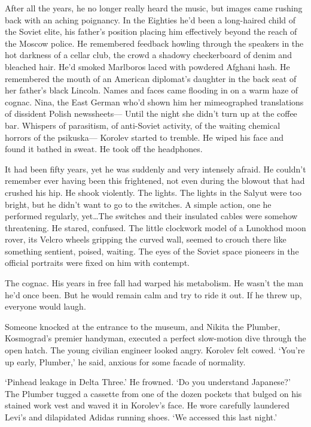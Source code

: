 After all the years, he no longer really heard the music, but images came rushing back with an aching poignancy. In the Eighties he’d been a long-haired child of the Soviet elite, his father’s position placing him effectively beyond the reach of the Moscow police. He remembered feedback howling through the speakers in the hot darkness of a cellar club, the crowd a shadowy checkerboard of denim and bleached hair. He’d smoked Marlboros laced with powdered Afghani hash. He remembered the mouth of an American diplomat’s daughter in the back seat of her father’s black Lincoln. Names and faces came flooding in on a warm haze of cognac. Nina, the East German who’d shown him her mimeographed translations of dissident Polish newssheets— Until the night she didn’t turn up at the coffee bar. Whispers of parasitism, of anti-Soviet activity, of the waiting chemical horrors of the psikuska— Korolev started to tremble. He wiped his face and found it bathed in sweat. He took off the headphones.

It had been fifty years, yet he was suddenly and very intensely afraid. He couldn’t remember ever having been this frightened, not even during the blowout that had crushed his hip. He shook violently. The lights. The lights in the Salyut were too bright, but he didn’t want to go to the switches. A simple action, one he performed regularly, yet…The switches and their insulated cables were somehow threatening. He stared, confused. The little clockwork model of a Lunokhod moon rover, its Velcro wheels gripping the curved wall, seemed to crouch there like something sentient, poised, waiting. The eyes of the Soviet space pioneers in the official portraits were fixed on him with contempt.

The cognac. His years in free fall had warped his metabolism. He wasn’t the man he’d once been. But he would remain calm and try to ride it out. If he threw up, everyone would laugh.

Someone knocked at the entrance to the museum, and Nikita the Plumber, Kosmograd’s premier handyman, executed a perfect slow-motion dive through the open hatch. The young civilian engineer looked angry. Korolev felt cowed. ‘You’re up early, Plumber,’ he said, anxious for some facade of normality.

‘Pinhead leakage in Delta Three.’ He frowned. ‘Do you understand Japanese?’ The Plumber tugged a cassette from one of the dozen pockets that bulged on his stained work vest and waved it in Korolev’s face. He wore carefully laundered Levi’s and dilapidated Adidas running shoes. ‘We accessed this last night.’

